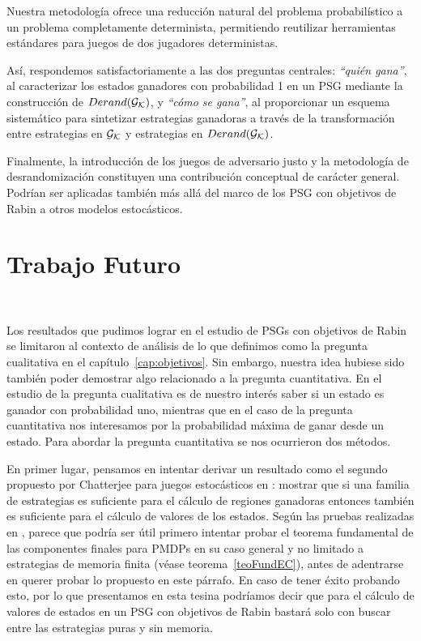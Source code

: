 Nuestra metodología ofrece una reducción natural del problema probabilístico a
un problema completamente determinista, permitiendo reutilizar herramientas
estándares para juegos de dos jugadores deterministas.

Así, respondemos satisfactoriamente a las dos preguntas centrales:
\textit{“quién gana”}, al caracterizar los estados ganadores con probabilidad 1
en un PSG mediante la construcción de $Derand(\mathcal{G}_{\mathcal{K}})$, y \textit{“cómo se gana”}, al
proporcionar un esquema sistemático para sintetizar estrategias ganadoras a
través de la transformación entre estrategias en $\mathcal{G}_{\mathcal{K}}$ y estrategias en $Derand(\mathcal{G}_{\mathcal{K}})$.

Finalmente, la introducción de los juegos de adversario justo y la metodología
de desrandomización constituyen una contribución conceptual de carácter
general. Podrían ser aplicadas también más allá del marco de los PSG con
objetivos de Rabin a otros modelos estocásticos.


\section{Trabajo Futuro}
~\label{cap:conclusions:sec:future}

Los resultados que pudimos lograr en el estudio de PSGs con objetivos de Rabin
se limitaron al contexto de análisis de lo que definimos como la pregunta
cualitativa en el capítulo~\ref{cap:objetivos}. Sin embargo, nuestra idea
hubiese sido también poder demostrar algo relacionado a la pregunta
cuantitativa. En el estudio de la pregunta cualitativa es de nuestro interés
saber si un estado es ganador con probabilidad uno, mientras que en el caso de
la pregunta cuantitativa nos interesamos por la probabilidad máxima de ganar
desde un estado. Para abordar la pregunta cuantitativa se nos ocurrieron dos
métodos.

En primer lugar, pensamos en intentar derivar un resultado como el segundo
propuesto por Chatterjee para juegos estocásticos en \cite{ComplexityRabin}:
mostrar que si una familia de estrategias es suficiente para el cálculo de
regiones ganadoras entonces también es suficiente para el cálculo de valores de
los estados. Según las pruebas realizadas en \cite{ComplexityRabin}, parece que
podría ser útil primero intentar probar el teorema fundamental de las
componentes finales para PMDPs en su caso general y no limitado a estrategias
de memoria finita (véase teorema~\ref{teoFundEC}), antes de adentrarse en
querer probar lo propuesto en este párrafo. En caso de tener éxito probando
esto, por lo que presentamos en esta tesina podríamos decir que para el cálculo
de valores de estados en un PSG con objetivos de Rabin bastará solo con buscar
entre las estrategias puras y sin memoria.

